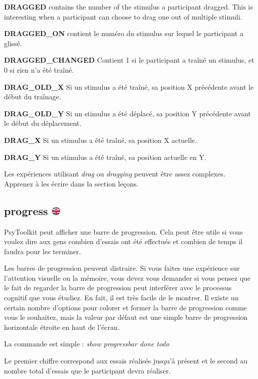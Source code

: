 \documentclass[
]{book}
\begin{document}
\textbf{DRAGGED} contains the number of the stimulus a participant dragged. This is interesting when a participant can choose to drag one out of multiple stimuli.

\textbf{DRAGGED\_ON} contient le numéro du stimulus sur lequel le participant a glissé.

\textbf{DRAGGED\_CHANGED} Contient 1 si le participant a traîné un stimulus, et 0 si rien n'a été traîné.

\textbf{DRAG\_OLD\_X} Si un stimulus a été traîné, sa position X précédente avant le début du traînage.

\textbf{DRAG\_OLD\_Y} Si un stimulus a été déplacé, sa position Y précédente avant le début du déplacement.

\textbf{DRAG\_X} Si un stimulus a été traîné, sa position X actuelle.

\textbf{DRAG\_Y} Si un stimulus a été traîné, sa position actuelle en Y.

Les expériences utilisant \emph{drag} ou \emph{dragging} peuvent être assez complexes. Apprenez à les écrire dans la section leçons.

\hypertarget{progress}{%
\subsection[progress ]{\texorpdfstring{progress \href{https://www.psytoolkit.org/doc3.4.0/syntax.html\#task-progress}{\protect\includegraphics{img/ukflag.png}}}{progress }}\label{progress}}

PsyToolkit peut afficher une barre de progression. Cela peut être utile si vous voulez dire aux gens combien d'essais ont été effectués et combien de temps il faudra pour les terminer.

Les barres de progression peuvent distraire. Si vous faites une expérience sur l'attention visuelle ou la mémoire, vous devez vous demander si vous pensez que le fait de regarder la barre de progression peut interférer avec le processus cognitif que vous étudiez.
En fait, il est très facile de le montrer. Il existe un certain nombre d'options pour colorer et former la barre de progression comme vous le souhaitez, mais la valeur par défaut est une simple barre de progression horizontale étroite en haut de l'écran.

La commande est simple : \emph{show progressbar done todo}

Le premier chiffre correspond aux essais réalisés jusqu'à présent et le second au nombre total d'essais que le participant devra réaliser.
\end{document}
